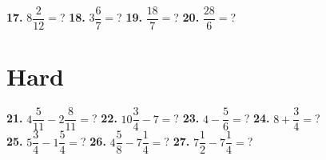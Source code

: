 \documentclass[a4paper]{article}
\begin{document}
\begin{Large}
\textbf{17.} $8\dfrac{2}{12}=$? \hspace{0.6cm}
\textbf{18.} $3\dfrac{6}{7}=$?  \hspace{0.6cm}
\textbf{19.} $\dfrac{18}{7}=$? \hspace{0.6cm}
\textbf{20.} $\dfrac{28}{6}=$?  
		
\section* {Hard}

\textbf{21.} $4\dfrac{5}{11}-2\dfrac{8}{11} =$? \hspace{0.6cm}
\textbf{22.} $10\dfrac{3}{4}-7 =$? \hspace{0.6cm}
\textbf{23.} $4-\dfrac{5}{6} =$? \hspace{0.6cm}
\textbf{24.} $8 + \dfrac{3}{4} =$? \\ [0.6cm]
\textbf{25.} $5 \dfrac{3}{4}-1\dfrac{5}{4} =$? \hspace{0.6cm}
\textbf{26.} $4\dfrac{5}{8}-7\dfrac{1}{4} =$?
\textbf{27.} $7\dfrac{1}{2}-7\dfrac{1}{4} =$?

\end{Large}
\end{document}
